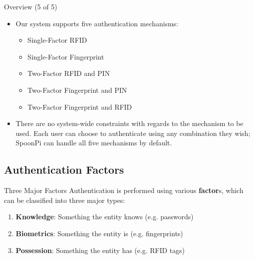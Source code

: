 \begin{frame}{Overview (5 of 5)}
\begin{itemize}
	\item<1-> Our system supports five authentication mechanisms:
	\begin{itemize}
		\item<2-> Single-Factor RFID
		\item<3-> Single-Factor Fingerprint
		\item<4-> Two-Factor RFID and PIN
		\item<5-> Two-Factor Fingerprint and PIN
		\item<6-> Two-Factor Fingerprint and RFID
	\end{itemize}
	\item<7->  There are no system-wide constraints with regards to the mechanism to be used. Each user can choose to authenticate using any combination they wish; SpoonPi can handle all five mechanisms by default.
\end{itemize}
\end{frame}

\subsection{Authentication Factors}
\begin{frame}{Three Major Factors}
Authentication is performed using various \textbf{factor}s, which can be classified into three major types:
\begin{enumerate}
    \item \textbf{Knowledge}: Something the entity knows (e.g. passwords)
    \item \textbf{Biometrics}: Something the entity is (e.g. fingerprints)
    \item \textbf{Possession}: Something the entity has (e.g. RFID tags)
\end{enumerate}
\end{frame}

